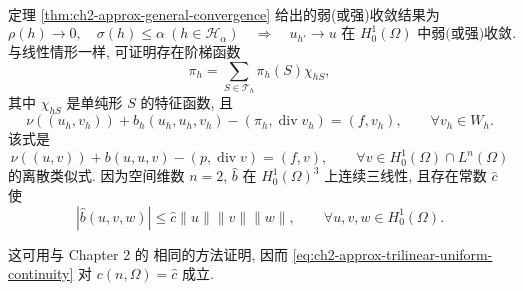 定理 \ref{thm:ch2-approx-general-convergence} 给出的弱(或强)收敛结果为
\begin{equation}
\rho(h)\to0,\quad\sigma(h)\leq\alpha\ (h\in\mathcal H_\alpha)
\quad\Longrightarrow\quad
u_{h'}\to u\text{ 在 }H_0^1(\Omega)\text{ 中弱(或强)收敛}.
\label{eq:ch2-apx2-h1-convergence}
\end{equation}
与线性情形一样, 可证明存在阶梯函数
\begin{equation}
\pi_h=\sum_{S\in\mathcal T_h}\pi_h(S)\chi_{hS},
\label{eq:ch2-apx2-pressure-step-function}
\end{equation}
其中 $\chi_{hS}$ 是单纯形 $S$ 的特征函数, 且
\begin{equation}
\nu((u_h,v_h))+b_h(u_h,u_h,v_h)-(\pi_h,\operatorname{div}v_h)
=(f,v_h),
\qquad\forall v_h\in W_h.
\label{eq:ch2-apx2-discrete-pressure-equation}
\end{equation}
该式是
\begin{equation}
\nu((u,v))+b(u,u,v)-(p,\operatorname{div}v)
=(f,v),
\qquad\forall v\in H_0^1(\Omega)\cap L^n(\Omega)
\label{eq:ch2-apx2-continuous-pressure-equation}
\end{equation}
的离散类似式. 因为空间维数 $n=2$, $\widehat b$ 在 $H_0^1(\Omega)^3$ 上连续三线性, 且存在常数 $\widehat c$ 使
\begin{equation}
|\widehat b(u,v,w)|
\leq\widehat c\lVert u\rVert\lVert v\rVert\lVert w\rVert,
\qquad\forall u,v,w\in H_0^1(\Omega).
\label{eq:ch2-apx2-trilinear-continuity}
\end{equation}

\hypertarget{chapter-02-page-157}{}
这可用与 Chapter 2 的  相同的方法证明, 因而 \eqref{eq:ch2-approx-trilinear-uniform-continuity} 对 $c(n,\Omega)=\widehat c$ 成立.

